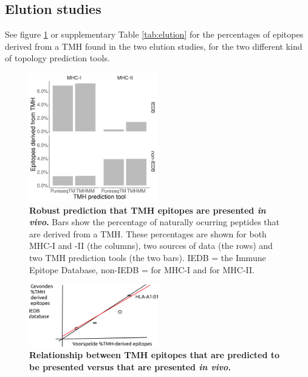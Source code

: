 \subsection{Elution studies}

See figure \ref{fig:elution_per_software} or
supplementary Table \ref{tab:elution} 
for the percentages of epitopes derived from a TMH 
found in the two elution studies, 
for the two different kind of topology prediction tools.



\clearpage

\begin{figure}[!htbp]
  \centering
  \includegraphics[width=0.5\textwidth]{bbbq_article_issue_157/results.png}
  \caption{
    \textbf{
      Robust prediction that TMH epitopes are presented \emph{in vivo}.
    }
    Bars show the percentage of naturally ocurring peptides
    that are derived from a TMH. These percentages are shown for
    both MHC-I and -II (the columns), two sources of data (the
    rows) and two TMH prediction tools (the two bars). 
    IEDB = the Immune Epitope Database, non-IEDB = 
    \cite{schellens2015comprehensive} for MHC-I and
    \cite{bergseng2015different} for MHC-II.
  }
  \label{fig:elution_per_software}
\end{figure}

\begin{figure}[!htbp]
  \centering
  \includegraphics[width=0.5\textwidth]{bbbq_article_issue_157/figure_2b.png}
  \caption{
    \textbf{
      Relationship between TMH epitopes that are predicted to
      be presented versus that are presented \emph{in vivo}.
    }
  }
  \label{fig:elution_versus}
\end{figure}

